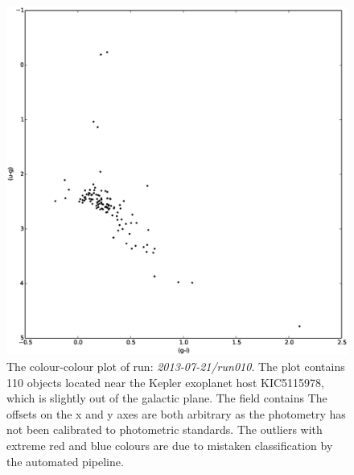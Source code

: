 \begin{figure}
\centering
\includegraphics[width=120mm]{images/2013-07-21-run010-2colour.eps}
\caption{The colour-colour plot of run: \emph{2013-07-21/run010}. The plot contains 110 objects located near the Kepler exoplanet host KIC5115978, which is slightly out of the galactic plane. The field contains The offsets on the x and y axes are both arbitrary as the photometry has not been calibrated to photometric standards. The outliers with extreme red and blue colours are due to mistaken classification by the automated pipeline. }
\label{fig:differentialtrad}
\end{figure}

